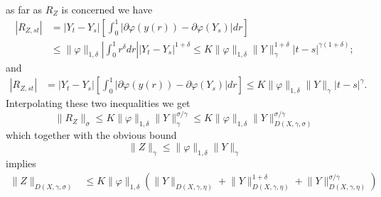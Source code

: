 \documentclass[a4paper,12pt,reqno]{amsproc}
\newcommand{\norm}[1]{\lVert #1\rVert}
\begin{document}
as far as $R_Z$ is concerned we have
\begin{equation*}
  \begin{split}
 |R_{Z,st}| & = |Y_t-Y_s|    
   \left[\int_0^1 \left|\partial \varphi(y(r))-\partial
  \varphi(Y_s)\right| dr\right] 
\\ & \le \|\varphi\|_{1,\delta} \left|\int_0^1
  r^\delta  dr\right| |Y_t-Y_s|^{1+\delta} \le K \|\varphi\|_{1,\delta}
  \|Y\|_{\gamma}^{1+\delta} |t-s|^{\gamma (1+\delta)};
  \end{split}
\end{equation*}
and
\begin{equation*}
  \begin{split}
 |R_{Z,st}| & = |Y_t-Y_s|    
   \left[\int_0^1 \left|\partial \varphi(y(r))-\partial
  \varphi(Y_s)\right| dr\right] \le K \|\varphi\|_{1,\delta}
   \|Y\|_\gamma |t-s|^\gamma.
\end{split}
\end{equation*}
Interpolating these two inequalities we get
\begin{equation*}
  \norm{R_Z}_{\sigma} \le K \|\varphi\|_{1,\delta}
  \|Y\|^{\sigma/\gamma}_\gamma
\le K \|\varphi\|_{1,\delta} \|Y\|^{\sigma/\gamma}_{D(X,\gamma,\sigma)}
\end{equation*}
which together with the obvious bound
\begin{equation*}
  \norm{Z}_\gamma \le \|\varphi\|_{1,\delta}\norm{Y}_\gamma
\end{equation*}
implies
 \begin{equation*}
   \begin{split}
\|Z\|_{D(X,\gamma,\sigma)} & \le 
K \|\varphi\|_{1,\delta}(
\norm{Y}_{D(X,\gamma,\eta)} + \norm{Y}^{1+\delta}_{D(X,\gamma,\eta)} + \norm{Y}^{\sigma/\gamma}_{D(X,\gamma,\eta)})
   \end{split}
 \end{equation*}
\end{document}
